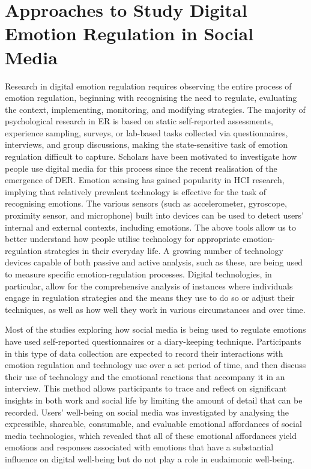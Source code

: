 \documentclass[lettersize,journal]{IEEEtran}
\begin{document}
\section{Approaches to Study Digital Emotion Regulation in Social Media}
Research in digital emotion regulation requires observing the entire process of emotion regulation, beginning with recognising the need to regulate, evaluating the context, implementing, monitoring, and modifying strategies. The majority of psychological research in ER is based on static self-reported assessments, experience sampling, surveys, or lab-based tasks collected via questionnaires, interviews, and group discussions, making the state-sensitive task of emotion regulation difficult to capture. Scholars have been motivated to investigate how people use digital media for this process since the recent realisation of the emergence of DER. Emotion sensing has gained popularity in HCI research, implying that relatively prevalent technology is effective for the task of recognising emotions. The various sensors (such as accelerometer, gyroscope, proximity sensor, and microphone) built into devices can be used to detect users' internal and external contexts, including emotions. The above tools allow us to better understand how people utilise technology for appropriate emotion-regulation strategies in their everyday life. A growing number of technology devices capable of both passive and active analysis, such as these, are being used to measure specific emotion-regulation processes. Digital technologies, in particular, allow for the comprehensive analysis of instances where individuals engage in regulation strategies and the means they use to do so or adjust their techniques, as well as how well they work in various circumstances and over time. 


Most of the studies exploring how social media is being used to regulate emotions have used self-reported questionnaires or a diary-keeping technique. Participants in this type of data collection are expected to record their interactions with emotion regulation and technology use over a set period of time, and then discuss their use of technology and the emotional reactions that accompany it in an interview. This method allows participants to trace and reflect on significant insights in both work and social life by limiting the amount of detail that can be recorded. Users' well-being on social media was investigated by analysing the expressible, shareable, consumable, and evaluable emotional affordances of social media technologies, which revealed that all of these emotional affordances yield emotions and responses associated with emotions that have a substantial influence on digital well-being but do not play a role in eudaimonic well-being. 
\end{document}
